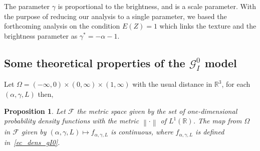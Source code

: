 \documentclass[journal]{IEEEtran}
\newtheorem{proposition}{Proposition}
\numberwithin{equation}{section}
\newcommand{\R}{\ensuremath{\mathbb{R}}}
\newcommand{\norm}[1]{\ensuremath{\left\| #1 \right\|}}
\newcommand{\pa}[1]{\ensuremath{\left( #1 \right)}}
\newcommand{\Rn}[1][n]{\ensuremath{\R^{#1}}}
\begin{document}
The parameter $\gamma$ is proportional to the brightness, and is a scale parameter.
With the purpose of reducing our analysis to a single parameter, we based the forthcoming analysis on the condition $E(Z)=1$ which links the texture and the brightness parameter as $\gamma^* =-\alpha-1$.

\subsection{Some theoretical properties of the $\mathcal{G}_I^{0}$ model}
Let $\Omega = \pa{-\infty,0}\times\pa{0,\infty}\times\pa{1,\infty}$
with the usual distance in $\Rn[3]$, for each $\pa{\alpha,\gamma,L}$ then,

\begin{proposition}\label{pr: continuidad}
	Let $\mathcal{F}$ the metric space given by the set of one-dimensional probability density functions with the metric $\norm{\cdot}$ of $L^{1}\pa{\R}$.
	The map from $\Omega$ in $\mathcal{F}$ given by 
	$\pa{\alpha,\gamma,L}\mapsto f_{\alpha,\gamma,L}$ is continuous, where $f_{\alpha,\gamma,L}$ is defined in~\ref{ec_dens_gI0}.
\end{proposition}
\end{document}
